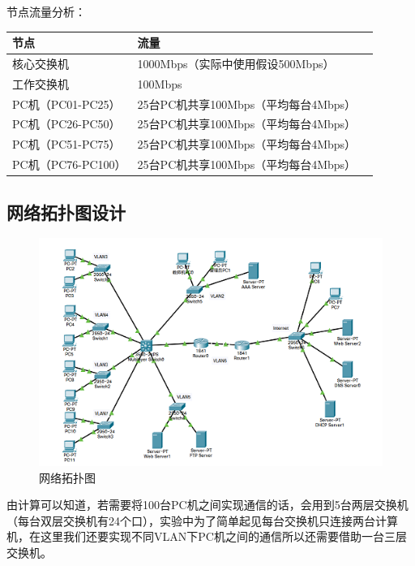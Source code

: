 \documentclass{imutthesis}
\begin{document}
节点流量分析：
\begin{table}[h]%
    \centering
    \begin{tabular}{p{5.0cm}<{\centering}p{9.0cm}<{\centering}p{2.0cm}<{\centering}}
    \hline
    节点 & 流量  \\ %
    \hline
    核心交换机  &  1000Mbps（实际中使用假设500Mbps） \\ 
    工作交换机 &  100Mbps \\ 
    PC机（PC01-PC25） &  25台PC机共享100Mbps（平均每台4Mbps）\\
    PC机（PC26-PC50） &  25台PC机共享100Mbps（平均每台4Mbps）\\
    PC机（PC51-PC75） &  25台PC机共享100Mbps（平均每台4Mbps）\\
    PC机（PC76-PC100）&  25台PC机共享100Mbps（平均每台4Mbps）\\
    \hline
    \end{tabular}
\end{table}

\subsection{网络拓扑图设计}
\begin{figure}[htbp]
    \centering
    \includegraphics{网络拓扑图.png}
    \caption{网络拓扑图}
\end{figure}

由计算可以知道，若需要将100台PC机之间实现通信的话，会用到5台两层交换机（每台双层交换机有24个口），实验中为了简单起见每台交换机只连接两台计算机，在这里我们还要实现不同VLAN下PC机之间的通信所以还需要借助一台三层交换机。
\end{document}
